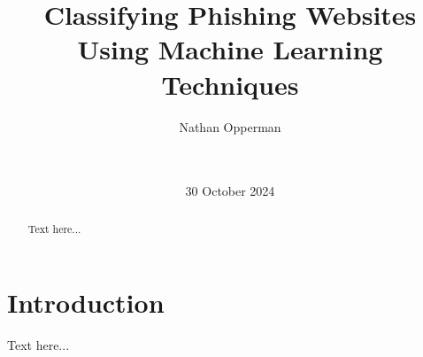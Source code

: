 \documentclass{sigkddExp}
\begin{document}
%

\title{Classifying Phishing Websites Using Machine Learning Techniques}
%

%


\author{
%
\alignauthor Nathan Opperman \\
       \\
       \\
}

\date{30 October 2024}
\maketitle
\begin{abstract}
Text here...
\end{abstract}

\section{Introduction}
Text here...
\end{document}
